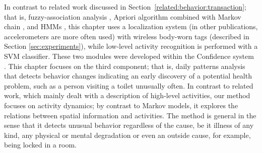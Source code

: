 In contrast to related work discussed in Section~\ref{related:behavior:transaction}; that is, fuzzy-association analysis \citep{Lee04daily}, Apriori algorithm combined with Markov chain \citep{Lymberopoulos}, and HMMs \citep{Monekosso}, this chapter uses a localization system (in other publications, accelerometers are more often used) with wireless body-worn tags (described in Section \ref{sec:experiments}), while low-level activity recognition is performed with a SVM classifier. These two modules were developed within the Confidence system \citep{Kaluza2010Agentbased}. This chapter focuses on the third component; that is, daily patterns analysis that detects behavior changes indicating an early discovery of a potential health problem, such as a person visiting a toilet unusually often. In contrast to related work, which mainly dealt with a description of high-level activities, our method focuses on activity dynamics; by contrast to Markov models, it explores the relations between spatial information and activities. %
The method is general in the sense that it detects unusual behavior regardless of the cause, be it illness of any kind, any physical or mental degradation or even an outside cause, for example, being locked in a room. 



%
%

